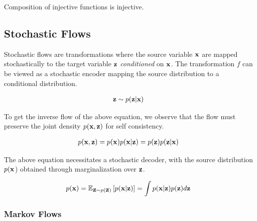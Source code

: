\documentclass[a4paper, 11pt]{article}
\begin{document}
Composition of injective functions is injective.


\subsection{Stochastic Flows}
Stochastic flows are transformations where the source variable $\vx$ are mapped stochastically to the target variable $\vz$ \emph{conditioned} on $\vx$. The transformation $f$ can be viewed as a stochastic encoder mapping the source distribution to a conditional distribution.

\begin{align}
    \vz \sim p(\vz | \vx)
\end{align}

To get the inverse flow of the above equation, we observe that the flow must preserve the joint density $p(\vx, \vz)$ for self consistency.

\begin{align}
    p(\vx, \vz) = p(\vx)p(\vx | \vz) = p(\vz)p(\vz|\vx)
\end{align}

The above equation necessitates a stochastic decoder, with the source distribution $p(\vx$) obtained through marginalization over $\vz$.

\begin{align} \label{eq:sto_marg}
    p(\vx)= \E_{\vz \sim p(\vz) } \left [ p(\vx | \vz) \right ] = \int p(\vx | \vz) p(\vz) d\vz
\end{align}

\subsubsection{Markov Flows}
\end{document}
